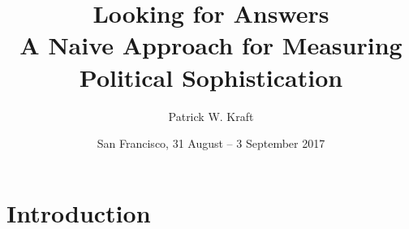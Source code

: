 \documentclass{beamer}
\author{Patrick W. Kraft}
\institute{113\textsuperscript{th} APSA Annual Meeting}
\title{Looking for Answers\\{\large A Naive Approach for Measuring Political Sophistication}}
\date{San Francisco, 31 August -- 3 September 2017}
\begin{document}
\frame{\titlepage}

\section{Introduction}
\end{document}
